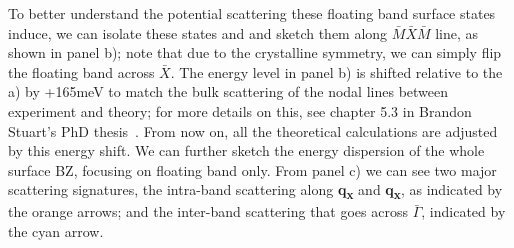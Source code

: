 To better understand the potential scattering these floating band surface states induce, we can isolate these states and and sketch them along $\bar{M}\bar{X}\bar{M}$ line, as shown in panel b); note that due to the crystalline symmetry, we can simply flip the floating band across $\bar{X}$. The energy level in panel b) is shifted relative to the a) by +165meV to match the bulk scattering of the nodal lines between experiment and theory; for more details on this, see chapter 5.3 in Brandon Stuart's PhD thesis~\cite{stuartScanningTunnellingMicroscopy2021}. From now on, all the theoretical calculations are adjusted by this energy shift. We can further sketch the energy dispersion of the whole surface \ac{BZ}, focusing on floating band only. From panel c) we can see two major scattering signatures, the intra-band scattering along \textbf{q\textsubscript{x}} and \textbf{q\textsubscript{x}}, as indicated by the orange arrows; and the inter-band scattering that goes across $\bar{\Gamma}$, indicated by the cyan arrow. 

